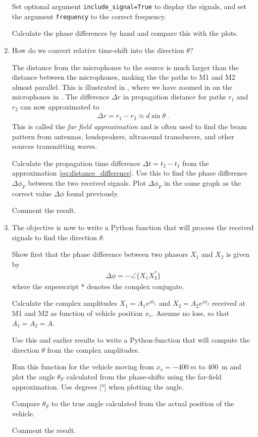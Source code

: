 \begin{enumerate}[1)]
	Set optional argument \verb|include_signal=True| to display the signals, and set the argument \verb|frequency| to the correct frequency. 
	
	Calculate the phase differences by hand and compare this with the plots.
	
	
\item How do we convert relative time-shift into the direction $\theta$?
	
	The distance from the microphones to the source is much larger than the distance between the microphones, making the the paths to M1 and M2 almost parallel. 
	This is illustrated in , where we have zoomed in on the microphones in . 
	The difference $\Delta r$ in propagation distance for paths $r_1$ and $r_2$ can now approximated to
	\begin{align}
		\Delta r = r_1-r_2 \approx d \sin\theta \:.
		\label{eq:distance_difference}
	\end{align}
	This is called the \emph{far field approximation} and is often used to find the beam pattern from antennas, loudspeakers, ultrasound transducers, and other sources transmitting waves.
	
	Calculate the propagation time difference $\Delta t=t_2-t_1$ from the approximation \eqref{eq:distance_difference}. Use this to find the phase difference $\Delta \phi_F$ between the two received signals.
	Plot $\Delta \phi_F$ in the same graph as the  correct value $\Delta \phi$ found previously.
	
	Comment the result.
	

\item The objective is now to write a Python function that will process the received signals to find the direction $\theta$. 
	
	Show first that the phase difference between two phasors $X_1$ and $X_2$ is given by
	\begin{align*}
		\Delta \phi = -\angle \{ X_1 X_2^* \}
	\end{align*}
	where the superscript * denotes the complex conjugate. 
	
	Calculate the complex amplitudes $X_1 = A_1 e^{j\phi_1}$ and $X_2 = A_2 e^{j\phi_2}$ received at M1 and M2 as function of vehicle position $x_v$. Assume no loss, so that $A_1=A_2=A$.
	
	
	Use this and earlier results to write a Python-function that will compute the direction $\theta$ from the complex amplitudes.
		
	Run this function for the vehicle moving from $x_v=\qty{-400}{m}$ to \qty{+400}{m} and plot the angle $\theta_F$ calculated from the phase-shifts using the far-field approximation. Use degrees [\unit{\degree}] when plotting the angle.
	
	
	
	Compare $\theta_F$ to the true angle calculated from the actual position of the vehicle.
	
	Comment the result.
		
\end{enumerate}

